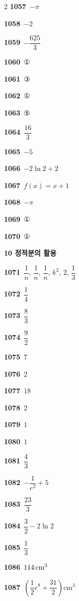 \documentclass[10pt,a4paper]{article}
\begin{document}
\begin{multicols}{2}
\noindent\textbf{1057}\ $-\pi$\par
\noindent\textbf{1058}\ $-2$\par
\noindent\textbf{1059}\ $-\dfrac{625}{3}$\par
\noindent\textbf{1060}\ ①\par
\noindent\textbf{1061}\ ③\par
\noindent\textbf{1062}\ ①\par
\noindent\textbf{1063}\ ⑤\par
\noindent\textbf{1064}\ $\dfrac{16}{3}$\par
\noindent\textbf{1065}\ $-5$\par
\noindent\textbf{1066}\ $-2\ln 2+2$\par
\noindent\textbf{1067}\ $f(x)=x+1$\par
\noindent\textbf{1068}\ $-\pi$\par
\noindent\textbf{1069}\ ①\par
\noindent\textbf{1070}\ ①\par
\noindent\textbf{10 정적분의 활용}\par\smallskip
\noindent\textbf{1071}\ $\dfrac{1}{n}$, $\dfrac{1}{n}$, $\dfrac{1}{n}$, $k^2$, $2$, $\dfrac{1}{3}$\par
\noindent\textbf{1072}\ $\dfrac{1}{4}$\par
\noindent\textbf{1073}\ $\dfrac{8}{3}$\par
\noindent\textbf{1074}\ $\dfrac{9}{2}$\par
\noindent\textbf{1075}\ $7$\par
\noindent\textbf{1076}\ $2$\par
\noindent\textbf{1077}\ $18$\par
\noindent\textbf{1078}\ $2$\par
\noindent\textbf{1079}\ $1$\par
\noindent\textbf{1080}\ $1$\par
\noindent\textbf{1081}\ $\dfrac{4}{3}$\par
\noindent\textbf{1082}\ $-\dfrac{1}{e^2}+5$\par
\noindent\textbf{1083}\ $\dfrac{23}{3}$\par
\noindent\textbf{1084}\ $\dfrac{3}{2}-2\ln 2$\par
\noindent\textbf{1085}\ $\dfrac{1}{3}$\par
\noindent\textbf{1086}\ $114\mkern3mu \mathrm{cm}^3$\par
\noindent\textbf{1087}\ $\left(\dfrac{1}{2}e^8+\dfrac{31}{2}\right)\mathrm{cm}^3$\par

\end{multicols}
\end{document}
